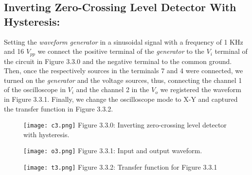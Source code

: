 \subsection{Inverting Zero-Crossing Level Detector With Hysteresis:}

Setting the {\itshape waveform generator} in a sinusoidal signal with a frequency of 1 KHz and 16 $V_{pp}$ we connect the positive terminal of the {\itshape generator} to the $V_{i}$ terminal of the circuit in Figure 3.3.0 and the negative terminal to the common ground. Then, once the respectively sources in the terminals 7 and 4 were connected, we turned on the {\itshape generator} and the voltage sources, thus, connecting the channel 1 of the oscilloscope in $V_{i}$ and the channel 2 in the $V_{o}$ we registered the waveform in Figure 3.3.1. Finally, we change the oscilloscope mode to X-Y and captured the transfer function in Figure 3.3.2. \hfill \break

\begin{figure}[H]
\texttt{[image: c3.png]}
\centering \linebreak \linebreak Figure 3.3.0: Inverting zero-crossing level detector with hysteresis.
\end{figure} \hfill

\begin{multicols}{2}
\begin{figure}[H]
\texttt{[image: o3.png]}
\centering \linebreak \linebreak Figure 3.3.1: Input and output waveform.
\end{figure} \hfill

\begin{figure}[H]
\texttt{[image: t3.png]}
\centering \linebreak \linebreak Figure 3.3.2: Transfer function for Figure 3.3.1
\end{figure} \hfill
\end{multicols} 

{\bfseries\itshape\color{carmine}{Observation:}} {\itshape\color{carmine}{In Figure 3.3.1 we can see two waveform, the yellow one it's the input of the circuit, analogously, the blue it's for the output.}}

\pagebreak